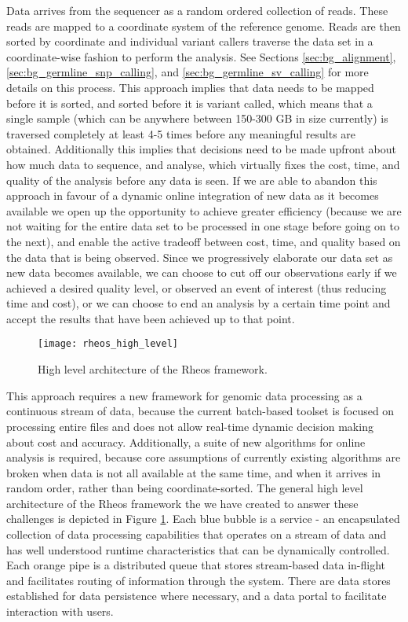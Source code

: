 Data arrives from the sequencer as a random ordered collection of reads. These reads are mapped to a coordinate system of the reference genome. Reads are then sorted by coordinate and individual variant callers traverse the data set in a coordinate-wise fashion to perform the analysis. See Sections \ref{sec:bg_alignment}, \ref{sec:bg_germline_snp_calling}, and \ref{sec:bg_germline_sv_calling} for more details on this process. This approach implies that data needs to be mapped before it is sorted, and sorted before it is variant called, which means that a single sample (which can be anywhere between 150-300 GB in size currently) is traversed completely at least 4-5 times before any meaningful results are obtained. Additionally this implies that decisions need to be made upfront about how much data to sequence, and analyse, which virtually fixes the cost, time, and quality of the analysis before any data is seen. If we are able to abandon this approach in favour of a dynamic online integration of new data as it becomes available we open up the opportunity to achieve greater efficiency (because we are not waiting for the entire data set to be processed in one stage before going on to the next), and enable the active tradeoff between cost, time, and quality based on the data that is being observed. Since we progressively elaborate our data set as new data becomes available, we can choose to cut off our observations early if we achieved a desired quality level, or observed an event of interest (thus reducing time and cost), or we can choose to end an analysis by a certain time point and accept the results that have been achieved up to that point. 

\begin{figure}[H]
\texttt{[image: rheos\_high\_level]}
\centering
\caption {High level architecture of the Rheos framework.}
\label{fig:rheos_high_level}
\end{figure}

This approach requires a new framework for genomic data processing as a continuous stream of data, because the current batch-based toolset is focused on processing entire files and does not allow real-time dynamic decision making about cost and accuracy. Additionally, a suite of new algorithms for online analysis is required, because core assumptions of currently existing algorithms are broken when data is not all available at the same time, and when it arrives in random order, rather than being coordinate-sorted. The general high level architecture of the Rheos framework the we have created to answer these challenges is depicted in Figure \ref{fig:rheos_high_level}. Each blue bubble is a service - an encapsulated collection of data processing capabilities that operates on a stream of data and has well understood runtime characteristics that can be dynamically controlled. Each orange pipe is a distributed queue that stores stream-based data in-flight and facilitates routing of information through the system. There are data stores established for data persistence where necessary, and a data portal to facilitate interaction with users.


